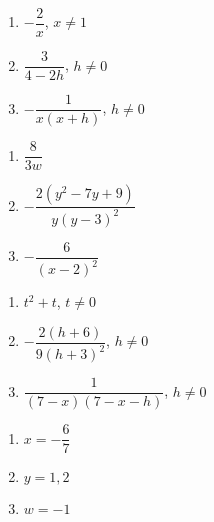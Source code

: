 \begin{multicols}{3}
\begin{enumerate}
\setcounter{enumi}{\value{HW}}

\item $-\dfrac{2}{x}$, $x \neq 1$
\item $\dfrac{3}{4-2h}$, $h \neq 0$
\item $-\dfrac{1}{x(x+h)}$, $h \neq 0$

\setcounter{HW}{\value{enumi}}
\end{enumerate}
\end{multicols}


\begin{multicols}{3}
\begin{enumerate}
\setcounter{enumi}{\value{HW}}

\item  $\dfrac{8}{3w}$
\item  $-\dfrac{2(y^2-7y+9)}{y(y-3)^2}$
\item  $-\dfrac{6}{(x-2)^2}$

 
\setcounter{HW}{\value{enumi}}
\end{enumerate}
\end{multicols}

\begin{multicols}{3}
\begin{enumerate}
\setcounter{enumi}{\value{HW}}

\item $t^2+t$, $t \neq 0$  
\item $-\dfrac{2(h+6)}{9(h+3)^2}$, $h \neq 0$ 
\item $\dfrac{1}{(7-x)(7-x-h)}$, $h \neq 0$ 

\setcounter{HW}{\value{enumi}}
\end{enumerate}
\end{multicols}



\begin{multicols}{3}
\begin{enumerate}
\setcounter{enumi}{\value{HW}}

\item $x = -\dfrac{6}{7}$
\item $y = 1, 2$ 
\item $w = -1$ 

\setcounter{HW}{\value{enumi}}
\end{enumerate}
\end{multicols}

